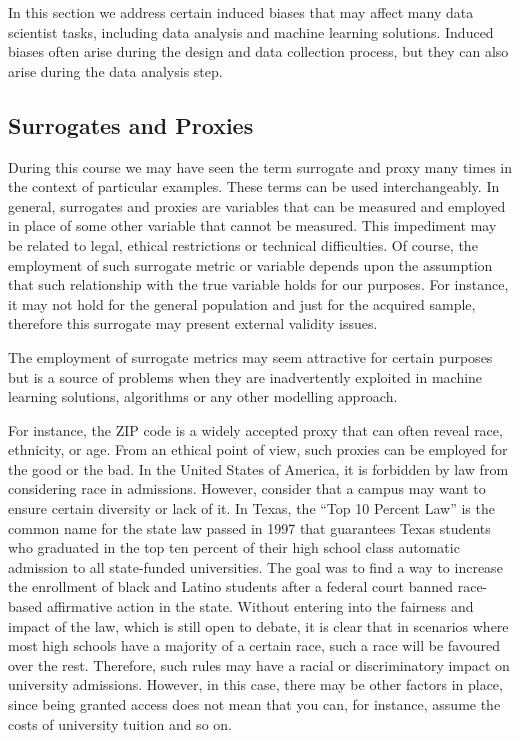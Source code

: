 \documentclass[
  12pt,
]{book}
\begin{document}
In this section we address certain induced biases that may affect many data scientist tasks, including data analysis and machine learning solutions. Induced biases often arise during the design and data collection process, but they can also arise during the data analysis step.

\subsection{Surrogates and Proxies}\label{surrogates-and-proxies}

During this course we may have seen the term surrogate and proxy many times in the context of particular examples. These terms can be used interchangeably. In general, surrogates and proxies are variables that can be measured and employed in place of some other variable that cannot be measured. This impediment may be related to legal, ethical restrictions or technical difficulties. Of course, the employment of such surrogate metric or variable depends upon the assumption that such relationship with the true variable holds for our purposes. For instance, it may not hold for the general population and just for the acquired sample, therefore this surrogate may present external validity issues.

The employment of surrogate metrics may seem attractive for certain purposes but is a source of problems when they are inadvertently exploited in machine learning solutions, algorithms or any other modelling approach.

For instance, the ZIP code is a widely accepted proxy that can often reveal race, ethnicity, or age. From an ethical point of view, such proxies can be employed for the good or the bad. In the United States of America, it is forbidden by law from considering race in admissions. However, consider that a campus may want to ensure certain diversity or lack of it. In Texas, the ``Top 10 Percent Law'' is the common name for the state law passed in 1997 that guarantees Texas students who graduated in the top ten percent of their high school class automatic admission to all state-funded universities. The goal was to find a way to increase the enrollment of black and Latino students after a federal court banned race-based affirmative action in the state. Without entering into the fairness and impact of the law, which is still open to debate, it is clear that in scenarios where most high schools have a majority of a certain race, such a race will be favoured over the rest. Therefore, such rules may have a racial or discriminatory impact on university admissions. However, in this case, there may be other factors in place, since being granted access does not mean that you can, for instance, assume the costs of university tuition and so on.
\end{document}
